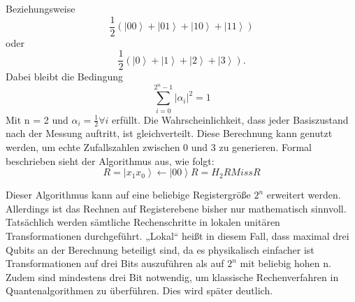 Beziehungsweise $$\frac{1}{2}\left(\left|\left.00\right\rangle\right.+\left|\left.01\right\rangle\right.+\left|\left.10\right\rangle\right.+\left|\left.11\right\rangle\right.\right)$$ oder $$\frac{1}{2}\left(\left|\left.0\right\rangle\right.+\left|\left.1\right\rangle\right.+\left|\left.2\right\rangle\right.+\left|\left.3\right\rangle\right.\right).$$
Dabei bleibt die Bedingung 
$$\sum_{i=0}^{2^n-1}\left|\alpha_i\right|^2=1$$
 Mit n = 2 und $\alpha_i=\frac{1}{2}\forall i$ erfüllt. Die Wahrscheinlichkeit, dass jeder Basiszustand nach der Messung auftritt, ist gleichverteilt. Diese Berechnung kann genutzt werden, um echte Zufallszahlen zwischen 0 und 3 zu generieren. Formal beschrieben sieht der Algorithmus aus, wie folgt:
	$$R=\left|\left.x_1x_0\right\rangle\right.\gets\left|\left.00\right\rangle\right.
	R=H_2R
	Miss R$$

Dieser Algorithmus kann auf eine beliebige Registergröße $2^n$ erweitert werden. 
Allerdings ist das Rechnen auf Registerebene bisher nur mathematisch sinnvoll. Tatsächlich werden sämtliche Rechenschritte in lokalen unitären Transformationen durchgeführt. „Lokal“ heißt in diesem Fall, dass maximal drei Qubits an der Berechnung beteiligt sind, da es physikalisch einfacher ist Transformationen auf drei Bits auszuführen als auf $2^n$ mit beliebig hohen n. Zudem sind mindestens drei Bit notwendig, um klassische Rechenverfahren in Quantenalgorithmen zu überführen. Dies wird später deutlich.

